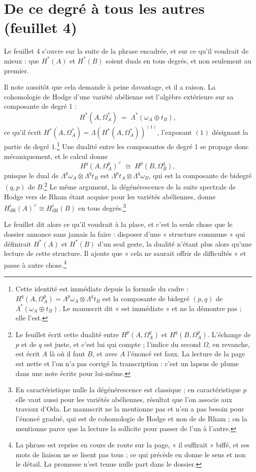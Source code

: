 \documentclass[11pt,a4paper]{article}
\begin{document}
\section*{De ce degré à tous les autres (feuillet 4)}

Le feuillet 4 s'ouvre sur la suite de la phrase encadrée, et sur ce qu'il
voudrait de mieux : que $H^{*}(A)$ et $H^{*}(B)$ soient duals en tous degrés,
et non seulement au premier.

Il note aussitôt que cela demande à peine davantage, et il a raison. La
cohomologie de Hodge d'une variété abélienne est l'algèbre extérieure sur sa
composante de degré 1 :
\[
  H^{*}(A, \Omega^{*}_A) \;=\; \Lambda^{*}\!\left(\omega_A \oplus t_B\right),
\]
ce qu'il écrit $H^{*}(A,\Omega^{*}_A) = \Lambda\!\left(H^{*}(A,
\Omega^{*}_A)\right)^{(1)}$, l'exposant $(1)$ désignant la partie de degré
$1$.\footnote{Cette identité est immédiate depuis la formule du cadre :
$H^q(A,\Omega^p_A) = \Lambda^p\omega_A \otimes \Lambda^q t_B$ est la
composante de bidegré $(p,q)$ de $\Lambda^{*}(\omega_A \oplus t_B)$. Le
manuscrit dit « est immédiate » et ne la démontre pas ; elle l'est.} Une
dualité entre les composantes de degré 1 se propage donc mécaniquement, et le
calcul donne
\[
  H^q(A, \Omega^p_A)^{\vee} \;\cong\; H^p(B, \Omega^q_B),
\]
puisque le dual de $\Lambda^p\omega_A \otimes \Lambda^q t_B$ est
$\Lambda^p t_A \otimes \Lambda^q \omega_B$, qui est la composante de bidegré
$(q,p)$ de $B$.\footnote{Le feuillet écrit cette dualité entre
$H^p(A,\Omega^q_A)$ et $H^q(B,\Omega^p_A)$. L'échange de $p$ et de $q$ est
juste, et c'est lui qui compte ; l'indice du second $\Omega$, en revanche, est écrit
$A$ là où il faut $B$, et avec $A$ l'énoncé est faux. La lecture de la page est
nette et l'on n'a pas corrigé la transcription : c'est un lapsus de plume dans
une note écrite pour lui-même.} Le même argument, la dégénérescence de la
suite spectrale de Hodge vers de Rham étant acquise pour les variétés
abéliennes, donne $H^i_{\mathrm{dR}}(A)^{\vee} \cong
H^i_{\mathrm{dR}}(B)$ en tous degrés.\footnote{En caractéristique nulle la
dégénérescence est classique ; en caractéristique $p$ elle vaut aussi pour les
variétés abéliennes, résultat que l'on associe aux travaux d'Oda. Le manuscrit
ne la mentionne pas et n'en a pas besoin pour l'énoncé gradué, qui est de
cohomologie de Hodge et non de de Rham ; on la mentionne parce que la lecture
la sollicite pour passer de l'un à l'autre.}

Le feuillet dit alors ce qu'il voudrait à la place, et c'est la seule chose que
le dossier annonce sans jamais la faire : disposer d'une « structure commune »
qui définirait $H^{*}(A)$ et $H^{*}(B)$ d'un seul geste, la dualité n'étant
plus alors qu'une lecture de cette structure. Il ajoute que « cela ne saurait
offrir de difficultés » et passe à autre chose.\footnote{La phrase est reprise
en cours de route sur la page, « il suffirait » biffé, et ses mots de liaison
ne se lisent pas tous ; ce qui précède en donne le sens et non le détail. La
promesse n'est tenue nulle part dans le dossier.}
\end{document}
